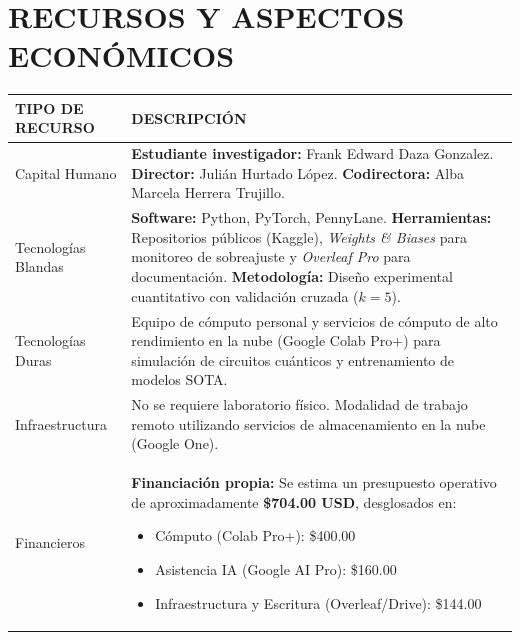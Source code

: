 \documentclass[12pt,letterpaper]{article}
\begin{document}
    

    \newpage
    \section{RECURSOS Y ASPECTOS ECONÓMICOS}
    \vspace{-0.5cm}
    
    \begin{tabularx}{\textwidth}{|p{}|X|}
        \hline
        \rowcolor{lightgray} \textbf{TIPO DE RECURSO} & \textbf{DESCRIPCIÓN} \\
        \hline
        Capital Humano & \textbf{Estudiante investigador:} Frank Edward Daza Gonzalez. \newline
        \textbf{Director:} Julián Hurtado López. \newline
        \textbf{Codirectora:} Alba Marcela Herrera Trujillo. \\
        \hline
        Tecnologías Blandas & \textbf{Software:} Python, PyTorch, PennyLane. \newline
        \textbf{Herramientas:} Repositorios públicos (Kaggle), \textit{Weights \& Biases} para monitoreo de sobreajuste y \textit{Overleaf Pro} para documentación. \newline
        \textbf{Metodología:} Diseño experimental cuantitativo con validación cruzada ($k=5$). \\
        \hline
        Tecnologías Duras & Equipo de cómputo personal y servicios de cómputo de alto rendimiento en la nube (Google Colab Pro+) para simulación de circuitos cuánticos y entrenamiento de modelos SOTA. \\
        \hline
        Infraestructura & No se requiere laboratorio físico. Modalidad de trabajo remoto utilizando servicios de almacenamiento en la nube (Google One). \\
        \hline
        Financieros & \textbf{Financiación propia:} Se estima un presupuesto operativo de aproximadamente \textbf{\$704.00 USD}, desglosados en:
        \begin{itemize}
            \item Cómputo (Colab Pro+): \$400.00
            \item Asistencia IA (Google AI Pro): \$160.00
            \item Infraestructura y Escritura (Overleaf/Drive): \$144.00
        \end{itemize} \\
        \hline
    \end{tabularx}

    \newpage
    \renewcommand{\refname}{REFERENCIAS}
    
    
\end{document}

